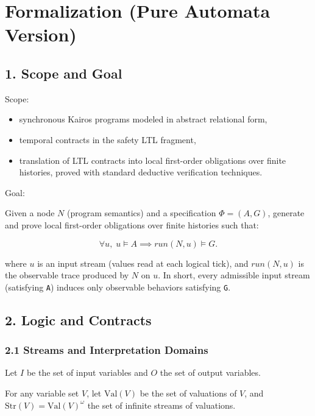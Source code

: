 \documentclass[
]{article}
\author{}
\date{}
\providecommand{\tightlist}{%
  \setlength{\itemsep}{0pt}\setlength{\parskip}{0pt}}
\begin{document}
\section{Formalization (Pure Automata
Version)}\label{formalization-pure-automata-version}

\subsection{1. Scope and Goal}\label{scope-and-goal}

Scope:

\begin{itemize}
\tightlist
\item
  synchronous Kairos programs modeled in abstract relational form,
\item
  temporal contracts in the safety LTL fragment,
\item
  translation of LTL contracts into local first-order obligations over
  finite histories, proved with standard deductive verification
  techniques.
\end{itemize}

Goal:

Given a node \(N\) (program semantics) and a specification
\(\Phi=(A,G)\), generate and prove local first-order obligations over
finite histories such that:

\[
\forall u,\;
u \models A
\implies
run(N,u) \models G.
\]

where \(u\) is an input stream (values read at each logical tick), and
\(run(N,u)\) is the observable trace produced by \(N\) on \(u\). In
short, every admissible input stream (satisfying \texttt{A}) induces
only observable behaviors satisfying \texttt{G}.

\subsection{2. Logic and Contracts}\label{logic-and-contracts}

\subsubsection{2.1 Streams and Interpretation
Domains}\label{streams-and-interpretation-domains}

Let \(I\) be the set of input variables and \(O\) the set of output
variables.

For any variable set \(V\), let \(\mathrm{Val}(V)\) be the set of
valuations of \(V\), and \(\mathrm{Str}(V)=\mathrm{Val}(V)^\omega\) the
set of infinite streams of valuations.
\end{document}
